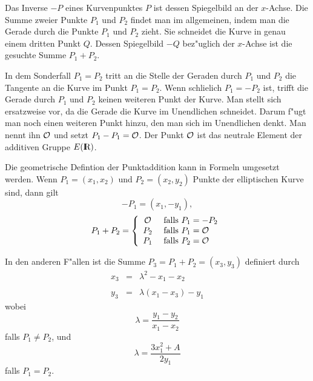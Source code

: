 Das Inverse $-P$ eines Kurvenpunktes $P$ ist dessen Spiegelbild an der
$x$-Achse. Die Summe zweier Punkte $P_1$ und $P_2$ findet man im
allgemeinen, indem man die Gerade durch die Punkte $P_1$ und $P_2$
zieht. Sie schneidet die Kurve in genau einem dritten Punkt
$Q$. Dessen Spiegelbild $-Q$ bez"uglich der $x$-Achse ist die gesuchte
Summe $P_1 + P_2$.

In dem Sonderfall $P_1=P_2$ tritt an die Stelle der Geraden durch
$P_1$ und $P_2$ die Tangente an die Kurve im Punkt $P_1=P_2$. Wenn
schlie\3lich $P_1=-P_2$ ist, trifft die Gerade durch $P_1$ und $P_2$
keinen weiteren Punkt der Kurve. Man stellt sich ersatzweise vor,
da\3 die Gerade die Kurve im Unendlichen schneidet.  Darum f"ugt man
noch einen weiteren Punkt hinzu, den man sich im Unendlichen denkt.
Man nennt ihn ${\cal O}$ und setzt $P_1-P_1={\cal O}$. Der Punkt ${\cal
O}$ ist das neutrale Element der additiven Gruppe $E(\R)$.

Die geometrische Defintion der Punktaddition kann in Formeln umgesetzt
werden. Wenn $P_1=(x_1,x_2)$ und $P_2=(x_2,y_2)$ Punkte der
elliptischen Kurve sind, dann gilt
\begin{equation} -P_1 = (x_1,-y_1) , 
\end{equation}
\begin{equation} P_1 + P_2 = 
                    \left\{ 
                       \begin{array}{cl}
                         {\cal O} & \mbox{ falls } P_1 = -P_2 \\
                         P_2      & \mbox{ falls } P_1 = {\cal O} \\
                         P_1      & \mbox{ falls } P_2 = {\cal O}
                       \end{array}
                    \right.
\end{equation}

In den anderen F"allen ist die Summe $P_3 = P_1 + P_2 = (x_3, y_3)$
definiert durch
\begin{equation}
\begin{array}{ccc}
  x_3 & = & \lambda^2 - x_1 - x_2                     \\
      &   &                                           \\
    y_3 & = & \lambda\left( x_1 - x_3\right) - y_1
\end{array}
\end{equation}
wobei 
$$ \lambda = \frac{y_1 - y_2}{x_1 - x_2} $$
falls $P_1\neq P_2$, und
$$ \lambda = \frac{3 x_1^2 + A}{2y_1}$$
falls $P_1 = P_2$.

